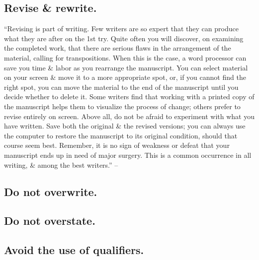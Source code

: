 \documentclass{article}
\numberwithin{equation}{section}
\begin{document}

\subsection{Revise \& rewrite.}
``Revising is part of writing. Few writers are so expert that they can produce what they are after on the 1st try. Quite often you will discover, on examining the completed work, that there are serious flaws in the arrangement of the material, calling for transpositions. When this is the case, a word processor can save you time \& labor as you rearrange the manuscript. You can select material on your screen \& move it to a more appropriate spot, or, if you cannot find the right spot, you can move the material to the end of the manuscript until you decide whether to delete it. Some writers find that working with a printed copy of the manuscript helps them to visualize the process of change; others prefer to revise entirely on screen. Above all, do not be afraid to experiment with what you have written. Save both the original \& the revised versions; you can always use the computer to restore the manuscript to its original condition, should that course seem best. Remember, it is no sign of weakness or defeat that your manuscript ends up in need of major surgery. This is a common occurrence in all writing, \& among the best writers.'' -- \cite[p. 82]{Strunk_White2019}


\subsection{Do not overwrite.}


\subsection{Do not overstate.}


\subsection{Avoid the use of qualifiers.}
\end{document}

